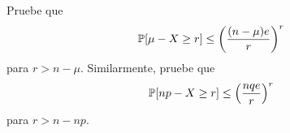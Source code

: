 \begin{statement}{30}
  Pruebe que
  \[
    \mathbb{P}[\mu - X \geq r] \leq \left(\frac{(n - \mu) e}{r}\right)^r
  \]
  para $r > n - \mu$. Similarmente, pruebe que
  \[
    \mathbb{P}[np - X \geq r] \leq \left(\frac{nqe}{r}\right)^r
  \]
  para $r > n - np$.
\end{statement}